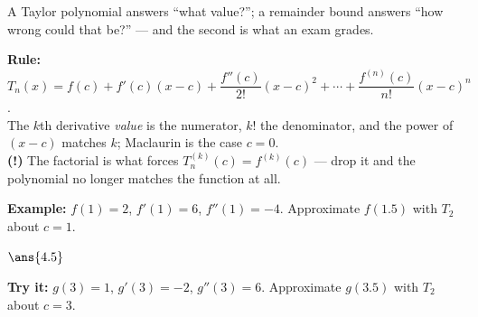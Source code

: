 \documentclass[12pt]{article}
\begin{document}

\noindent\small A Taylor polynomial answers ``what value?''; a remainder
bound answers ``how wrong could that be?'' --- and the second is what an exam grades.
\normalsize

\begin{formulabox}
\textbf{Rule:}
$T_n(x) = f(c) + f'(c)(x-c) + \dfrac{f''(c)}{2!}(x-c)^2 + \cdots
+ \dfrac{f^{(n)}(c)}{n!}(x-c)^n$.\\[3pt]
The $k$th derivative \emph{value} is the numerator, $k!$ the denominator, and
the power of $(x-c)$ matches $k$; Maclaurin is the case $c = 0$.\\[3pt]
\textbf{(!)} The factorial is what forces $T_n^{(k)}(c) = f^{(k)}(c)$ --- drop
it and the polynomial no longer matches the function at all.
\end{formulabox}
\begin{examplebox}
\textbf{Example:} $f(1) = 2$, $f'(1) = 6$, $f''(1) = -4$. Approximate $f(1.5)$
with $T_2$ about $c = 1$.
\par
$\ans{4.5}$
\end{examplebox}
\begin{tryitbox}
\textbf{Try it:} $g(3) = 1$, $g'(3) = -2$, $g''(3) = 6$. Approximate $g(3.5)$
with $T_2$ about $c = 3$.\\[2pt]
\end{tryitbox}
\end{document}
